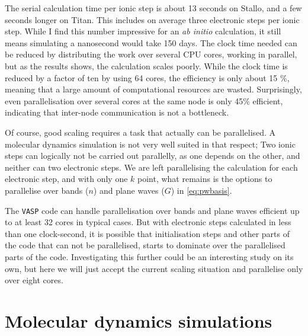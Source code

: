 \documentclass[11pt,bibliography=totoc,index=totoc]{scrbook}   %
\newcommand{\vasp}{{\texttt{VASP}}} %
\begin{document}
The serial calculation time per ionic step is about 13 seconds on Stallo, and a few seconds longer on Titan. This includes on average three electronic steps per ionic step.
While I find this number impressive for an \textit{ab initio} calculation, it still means simulating a nanosecond would take 150 days.
The clock time needed can be reduced by distributing the work over several CPU cores, working in parallel, but as the results shows, the calculation scales poorly. 
While the clock time is reduced by a factor of ten by using 64 cores, the efficiency is only about 15 \%, meaning that a large amount of computational resources are wasted.
Surprisingly, even parallelisation over several cores at the same node is only 45\% efficient, indicating that inter-node communication is not a bottleneck. 

Of course, good scaling requires a task that actually can be parallelised. 
A molecular dynamics simulation is not very well suited in that respect; Two ionic steps can logically not be carried out parallelly, as one depends on the other, and neither can two electronic steps. 
We are left parallelising the calculation for each electronic step, and with only one $k$ point, what remains is the options to parallelise over bands ($n$) and plane waves ($G$) in \eqref{eq:pwbasis}.

The {\vasp} code can handle parallelisation over bands and plane waves efficient up to at least 32 cores in typical cases.\cite{VASP-guide} 
But with electronic steps calculated in less than one clock-second, it is possible that initialisation steps and other parts of the code that can not be parallelised, starts to dominate over the parallelised parts of the code. 
Investigating this further could be an interesting study on its own, 
but here we will just accept the current scaling situation and parallelise only over eight cores. 


%
\chapter{Molecular dynamics simulations}\label{cha:MD}
%
\end{document}
